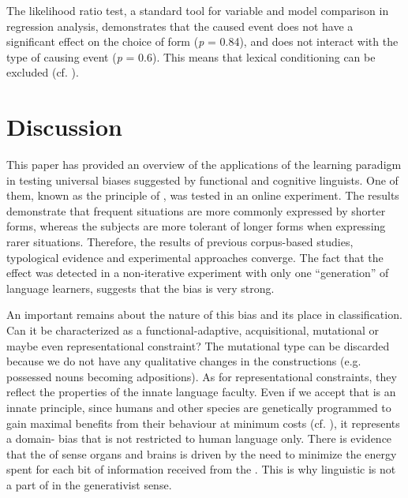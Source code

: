 \documentclass[output=paper]{langsci/langscibook}
\begin{document}
The likelihood ratio test, a standard tool for variable  and model comparison in regression analysis, demonstrates that the caused event does not have a significant effect on the choice of form (\textit{p} = 0.84), and does not interact with the type of causing event (\textit{p} = 0.6). This means that lexical conditioning can be excluded (cf. \citealt{SmithWonnacott2010}). 

\section{Discussion}\label{sec:levshina:4}

This paper has provided an overview of the applications of the  learning paradigm in testing universal biases suggested by functional and cognitive linguists. One of them, known as the principle of , was tested in an online experiment. The results demonstrate that frequent  situations are more commonly expressed by shorter forms, whereas the subjects are more tolerant of longer forms when expressing rarer  situations. Therefore, the results of previous corpus-based studies, typological evidence and experimental approaches converge. The fact that the effect was detected in a non-iterative experiment with only one “generation” of language learners, suggests that the bias is very strong.

An important  remains about the nature of this bias and its place in  classification. Can it be characterized as a functional-adaptive, acquisitional, mutational or maybe even representational constraint? The mutational type can be discarded because we do not have any qualitative changes in the constructions (e.g. possessed nouns becoming adpositions). As for representational constraints, they reflect the properties of the innate language faculty. Even if we accept that  is an innate principle, since humans and other species are genetically programmed to gain maximal benefits from their behaviour at minimum costs (cf. \citealt{ParkerSmith1990}), it represents a domain- bias that is not restricted to human language only. There is evidence that the  of sense organs and brains is driven by the need to minimize the energy spent for each bit of information received from the  \citep[3]{Stone2015}. This is why linguistic  is not a part of  in the generativist sense. 
\end{document}
